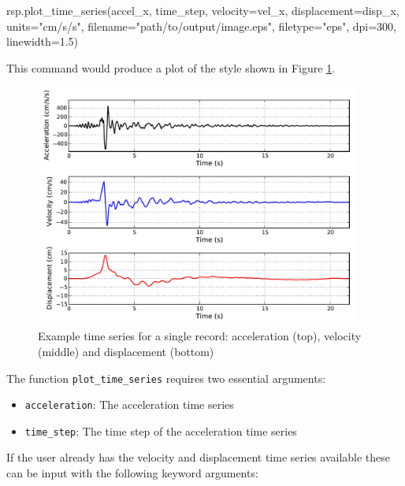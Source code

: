 \begin{python}[frame=single]
rsp.plot_time_series(accel_x,
                     time_step,
                     velocity=vel_x,
                     displacement=disp_x,
                     units="cm/s/s",
                     filename="path/to/output/image.eps",
                     filetype="eps",
                     dpi=300,
                     linewidth=1.5) 
\end{python}

This command would produce a plot of the style shown in Figure \ref{fig:time_series}.

\begin{figure}[htb]
	\centering
		\includegraphics[height=8cm, keepaspectratio=true]{./figures/ims/timeseries_plot1.pdf}
	\caption{Example time series for a single record: acceleration (top), velocity (middle) and displacement (bottom)}
	\label{fig:time_series}
\end{figure}

\noindent The function \verb=plot_time_series= requires two essential arguments: 
\begin{itemize}
\item \verb=acceleration=: The acceleration time series
\item \verb=time_step=: The time step of the acceleration time series
\end{itemize}

\noindent If the user already has the velocity and displacement time series available these can be input with the following keyword arguments:

